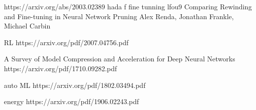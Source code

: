https://arxiv.org/abs/2003.02389 hada f fine tunning lfou9
Comparing Rewinding and Fine-tuning in Neural Network Pruning
Alex Renda, Jonathan Frankle, Michael Carbin



RL
https://arxiv.org/pdf/2007.04756.pdf

A Survey of Model Compression and Acceleration
for Deep Neural Networks
https://arxiv.org/pdf/1710.09282.pdf

auto ML
https://arxiv.org/pdf/1802.03494.pdf


energy 
https://arxiv.org/pdf/1906.02243.pdf